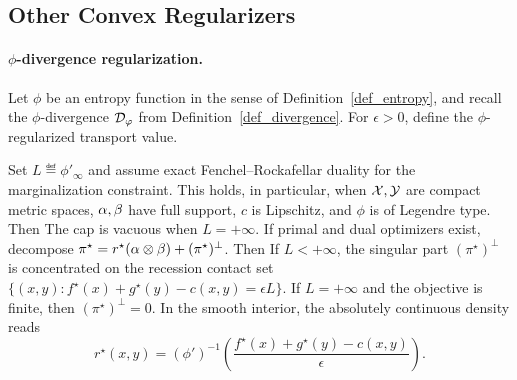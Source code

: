 \subsection{Other Convex Regularizers}
\label{sec-sinkhorn-other-regularizers}
\paragraph{\texorpdfstring{$\phi$-divergence regularization.}{phi-divergence regularization.}}
Let $\phi$ be an entropy function in the sense of Definition~\ref{def_entropy}, and recall the $\phi$-divergence $\mathcal{D}_\varphi$ from Definition~\ref{def_divergence}. For $\epsilon>0$, define the $\phi$-regularized transport value.

\begin{defn}\label{def-phi-regularized-ot}
\end{defn}
\begin{prop}\label{prop-phi-regularized-ot-dual}
Set $L\eqdef\phi'_\infty$ and assume exact Fenchel--Rockafellar duality for the marginalization constraint. This holds, in particular, when $\mathcal{X},\mathcal{Y}$ are compact metric spaces, $\alpha,\beta$ have full support, $c$ is Lipschitz, and $\phi$ is of Legendre type. Then
The cap is vacuous when $L=+\infty$. If primal and dual optimizers exist, decompose
$\pi^\star=r^\star(\alpha\otimes\beta)+(\pi^\star)^\perp$. Then
If $L<+\infty$, the singular part $(\pi^\star)^\perp$ is concentrated on the recession contact set
\(\{(x,y):f^\star(x)+g^\star(y)-c(x,y)=\epsilon L\}.\)
If $L=+\infty$ and the objective is finite, then $(\pi^\star)^\perp=0$. In the smooth interior, the absolutely continuous density reads
\[
r^\star(x,y)
=
(\phi')^{-1}
\!\left(\frac{f^\star(x)+g^\star(y)-c(x,y)}{\epsilon}\right).
\]
\end{prop}
